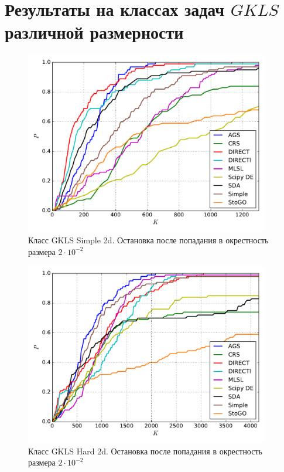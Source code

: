 \documentclass[a4paper]{article}
\begin{document}

\section{Результаты на классах задач $GKLS$ различной размерности}

\begin{figure}[H]
  \center
  \includegraphics[width=0.95\textwidth]{../experiments/gklss2d/cmc.pdf}
  \caption{Класс GKLS Simple 2d. Остановка после попадания в окрестность размера $2\cdot10^{-2}$}
  \label{fig:}
\end{figure}


\begin{figure}[H]
  \center
  \includegraphics[width=0.95\textwidth]{../experiments/gklsh2d/cmc.pdf}
  \caption{Класс GKLS Hard 2d. Остановка после попадания в окрестность размера $2\cdot10^{-2}$}
  \label{fig:}
\end{figure}
\end{document}
